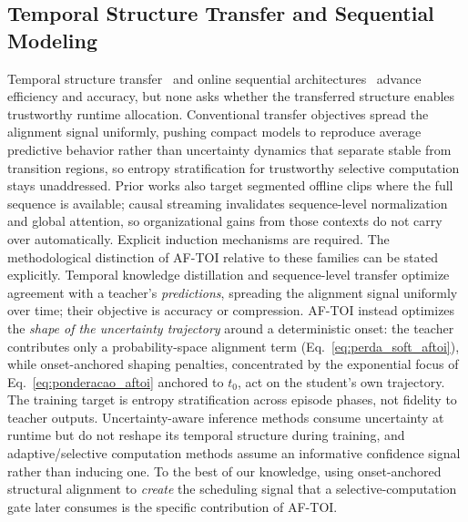 \documentclass[a4paper,fleqn]{cas-dc}
\begin{document}
\subsection{Temporal Structure Transfer and Sequential Modeling}
\label{sec:rel_temporal}
Temporal structure transfer~\cite{hinton2015distilling,bajestani2020tkd,zheng2024tempdistiller} and online sequential architectures~\cite{zhao2022testra,lstr2021} advance efficiency and accuracy, but none asks whether the transferred structure enables trustworthy runtime allocation. Conventional transfer objectives spread the alignment signal uniformly, pushing compact models to reproduce average predictive behavior rather than uncertainty dynamics that separate stable from transition regions, so entropy stratification for trustworthy selective computation stays unaddressed. Prior works also target segmented offline clips where the full sequence is available; causal streaming invalidates sequence-level normalization and global attention, so organizational gains from those contexts do not carry over automatically. Explicit induction mechanisms are required.
{\color{\revcolor}The methodological distinction of \mbox{AF-TOI} relative to these
families can be stated explicitly. Temporal knowledge distillation and
sequence-level transfer optimize agreement with a teacher's
\emph{predictions}, spreading the alignment signal uniformly over time; their
objective is accuracy or compression. \mbox{AF-TOI} instead optimizes the
\emph{shape of the uncertainty trajectory} around a deterministic onset: the
teacher contributes only a probability-space alignment term
(Eq.~\ref{eq:perda_soft_aftoi}), while onset-anchored shaping penalties,
concentrated by the exponential focus of Eq.~\ref{eq:ponderacao_aftoi}
anchored to $t_0$, act on the student's own trajectory. The training target is
entropy stratification across episode phases, not fidelity to teacher
outputs. Uncertainty-aware inference methods consume
uncertainty at runtime but do not reshape its temporal structure during
training, and adaptive/selective computation methods assume an informative
confidence signal rather than inducing one. To the best of our knowledge,
using onset-anchored structural alignment to \emph{create} the scheduling
signal that a selective-computation gate later consumes is the specific
contribution of \mbox{AF-TOI}.}
\end{document}
